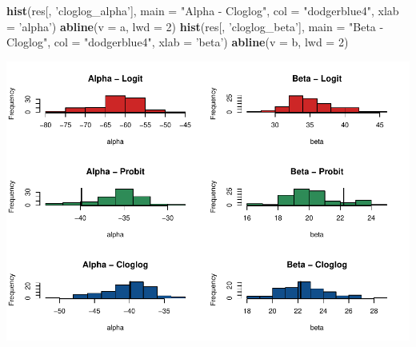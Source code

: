 \documentclass[]{article}
\newenvironment{Shaded}{\begin{snugshade}}{\end{snugshade}}
\newcommand{\DataTypeTok}[1]{\textcolor[rgb]{0.13,0.29,0.53}{#1}}
\newcommand{\DecValTok}[1]{\textcolor[rgb]{0.00,0.00,0.81}{#1}}
\newcommand{\KeywordTok}[1]{\textcolor[rgb]{0.13,0.29,0.53}{\textbf{#1}}}
\newcommand{\NormalTok}[1]{#1}
\newcommand{\OperatorTok}[1]{\textcolor[rgb]{0.81,0.36,0.00}{\textbf{#1}}}
\newcommand{\StringTok}[1]{\textcolor[rgb]{0.31,0.60,0.02}{#1}}
\begin{document}
\begin{Shaded}
\begin{Highlighting}[]
\KeywordTok{hist}\NormalTok{(res[, }\StringTok{'cloglog_alpha'}\NormalTok{], }\DataTypeTok{main =} \StringTok{"Alpha - Cloglog"}\NormalTok{, }\DataTypeTok{col =} \StringTok{"dodgerblue4"}\NormalTok{, }\DataTypeTok{xlab =} \StringTok{'alpha'}\NormalTok{) }
\KeywordTok{abline}\NormalTok{(}\DataTypeTok{v =}\NormalTok{ a, }\DataTypeTok{lwd =} \DecValTok{2}\NormalTok{)}
\KeywordTok{hist}\NormalTok{(res[, }\StringTok{'cloglog_beta'}\NormalTok{], }\DataTypeTok{main =} \StringTok{"Beta - Cloglog"}\NormalTok{, }\DataTypeTok{col =} \StringTok{"dodgerblue4"}\NormalTok{, }\DataTypeTok{xlab =} \StringTok{'beta'}\NormalTok{) }
\KeywordTok{abline}\NormalTok{(}\DataTypeTok{v =}\NormalTok{ b, }\DataTypeTok{lwd =} \DecValTok{2}\NormalTok{)}
\end{Highlighting}
\end{Shaded}

\includegraphics{FinalProject-SDSII_files/figure-latex/unnamed-chunk-44-1.pdf}

\begin{Shaded}
\end{Shaded}
\end{document}
